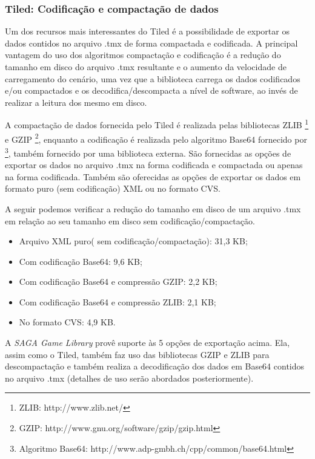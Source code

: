 \subsubsection{Tiled: Codificação e compactação de dados}
%
%
Um dos recursos mais interessantes do Tiled é a possibilidade de exportar os dados contidos no arquivo .tmx de forma compactada e codificada. A principal vantagem do uso dos algoritmos compactação e codificação é a redução do tamanho em disco do arquivo .tmx resultante e o aumento da velocidade de carregamento do cenário, uma vez que a biblioteca carrega os dados codificados e/ou compactados e os decodifica/descompacta a nível de software, ao invés de realizar a leitura dos mesmo em disco. 
\par 
A compactação de dados fornecida pelo Tiled é realizada pelas bibliotecas ZLIB \footnote{ZLIB: http://www.zlib.net/} e GZIP \footnote{GZIP: http://www.gnu.org/software/gzip/gzip.html}, enquanto a codificação é realizada pelo algoritmo Base64 fornecido por \footnote{Algoritmo Base64: http://www.adp-gmbh.ch/cpp/common/base64.html}, também fornecido por uma biblioteca externa. São fornecidas as opções de exportar os dados no arquivo .tmx na forma codificada e compactada ou apenas na forma codificada. Também são oferecidas as opções de exportar os dados em formato puro (sem codificação) XML ou no formato CVS. 
\par 
A seguir podemos verificar a redução do tamanho em disco de um arquivo .tmx em relação ao seu tamanho em disco sem codificação/compactação.
%
\begin{itemize}
 \item Arquivo XML puro( sem codificação/compactação): 31,3 KB;
 \item Com codificação Base64: 9,6 KB;
 \item Com codificação Base64 e compressão GZIP: 2,2 KB;
 \item Com codificação Base64 e compressão ZLIB: 2,1 KB;
 \item No formato CVS: 4,9 KB.
\end{itemize}
%
A \textit{SAGA Game Library} provê suporte às 5 opções de exportação acima. Ela, assim como o Tiled, também faz uso das bibliotecas GZIP e ZLIB para descompactação e também realiza a decodificação dos dados em Base64 contidos no arquivo .tmx (detalhes de uso serão abordados posteriormente).
%
%
%
%

